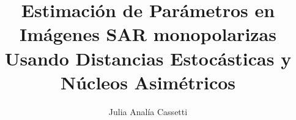 \documentclass[oneside,numbers,spanish,nobibtoc]{ezthesis}
\author{Julia Analía Cassetti}
\title{Estimación de Parámetros en Imágenes SAR monopolarizas Usando Distancias Estocásticas y Núcleos Asimétricos}
\begin{document}









\renewcommand{\tablename}{Tabla} 
\renewcommand{\listtablename}{Indice de tablas}
\tableofcontents
\listoffigures
\listoftables









\appendix
%
%
%


\end{document}
